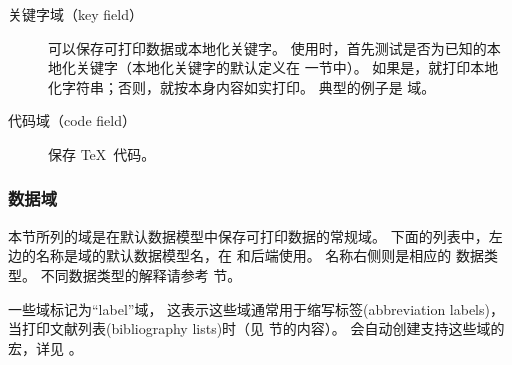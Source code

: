 \begin{description}
\begin{description}
\item[关键字域（key field）] 可以保存可打印数据或本地化关键字。
使用时，首先测试是否为已知的本地化关键字（本地化关键字的默认定义在  一节中）。
如果是，就打印本地化字符串；否则，就按本身内容如实打印。
典型的例子是  域。


\item[代码域（code field）] 保存 \TeX\ 代码。

\end{description}
\end{description}

\subsubsection{数据域}
\label{bib:fld:dat}


本节所列的域是在默认数据模型中保存可打印数据的常规域。
下面的列表中，左边的名称是域的默认数据模型名，在 \biblatex 和后端使用。
名称右侧则是相应的 \biblatex 数据类型。
不同数据类型的解释请参考  节。


一些域标记为“label”域，
这表示这些域通常用于缩写标签(abbreviation labels)，当打印文献列表(bibliography lists)时（见 节的内容）。
\biblatex 会自动创建支持这些域的宏，详见 。

